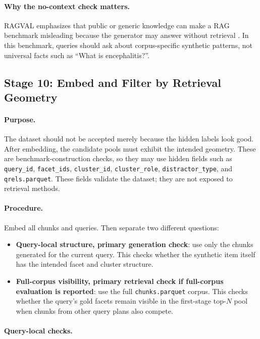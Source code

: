 \documentclass[11pt,a4paper]{article}
\newcommand{\field}[1]{\texttt{#1}}
\newcommand{\stage}[2]{\subsection{\textcolor{betterblue}{#1}: #2}}
\begin{document}
\paragraph{Why the no-context check matters.}
RAGVAL emphasizes that public or generic knowledge can make a RAG benchmark misleading because the generator may answer without retrieval \citep{kenneweg2024ragval}. In this benchmark, queries should ask about corpus-specific synthetic patterns, not universal facts such as ``What is encephalitis?''.

\stage{Stage 10}{Embed and Filter by Retrieval Geometry}

\paragraph{Purpose.}
The dataset should not be accepted merely because the hidden labels look good. After embedding, the candidate pools must exhibit the intended geometry. These are benchmark-construction checks, so they may use hidden fields such as \field{query\_id}, \field{facet\_ids}, \field{cluster\_id}, \field{cluster\_role}, \field{distractor\_type}, and \field{qrels.parquet}. These fields validate the dataset; they are not exposed to retrieval methods.

\paragraph{Procedure.}
Embed all chunks and queries. Then separate two different questions:

\begin{itemize}[leftmargin=*]
	\item \textbf{Query-local structure, primary generation check}: use only the chunks generated for the current query. This checks whether the synthetic item itself has the intended facet and cluster structure.
	\item \textbf{Full-corpus visibility, primary retrieval check if full-corpus evaluation is reported}: use the full \field{chunks.parquet} corpus. This checks whether the query's gold facets remain visible in the first-stage top-$N$ pool when chunks from other query plans also compete.
\end{itemize}

\paragraph{Query-local checks.}
\end{document}
